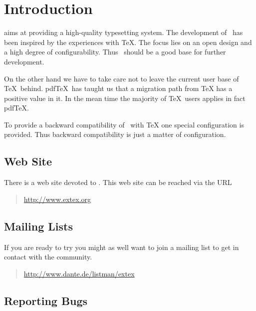 \documentclass{extex-doc}
\begin{document}
\tableofcontents

\chapter{Introduction}

\ExTeX{} aims at providing a high-quality typesetting system. The
development of \ExTeX\ has been inspired by the experiences with \TeX.
The focus lies on an open design and a high degree of configurability.
Thus \ExTeX\ should be a good base for further development.

On the other hand we have to take care not to leave the current user
base of \TeX\ behind. pdf\TeX\ has taught us that a migration path
from \TeX{} has a positive value in it. In the mean time
the majority of \TeX\ users applies in fact
pdf\TeX{}.

To provide a backward compatibility of \ExTeX\ with
\TeX{} one special configuration is provided. Thus
backward compatibility is just a matter of configuration.


\section{Web Site}

There is a web site devoted to \ExTeX. This
web site can be reached via the URL

\begin{quotation}
  \url{http://www.extex.org}
\end{quotation}


\section{Mailing Lists}

If you are ready to try \ExTeX{} you might as well want to join a
mailing list to get in contact with the community.

\begin{quotation}
  \url{http://www.dante.de/listman/extex}
\end{quotation}


\section{Reporting Bugs}
\end{document}
